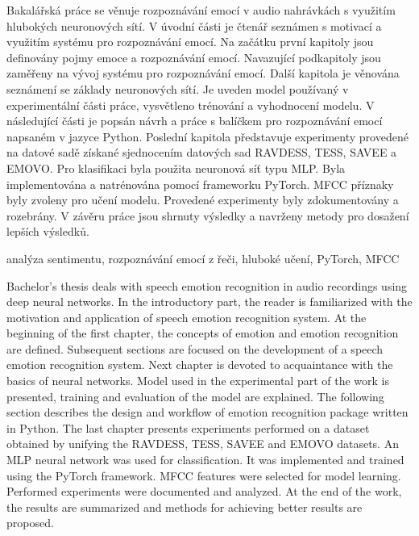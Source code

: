 \documentclass[FM,BP]{tulthesis}
\begin{document}

\begin{abstractCZ}
Bakalářská práce se věnuje rozpoznávání emocí v audio nahrávkách s využitím hlubokých neuronových sítí. V úvodní části je čtenář seznámen s motivací a využitím systému pro rozpoznávání emocí. Na začátku první kapitoly jsou definovány pojmy emoce a rozpoznávání emocí. Navazující podkapitoly jsou zaměřeny na vývoj systému pro rozpoznávání emocí. Další kapitola je věnována seznámení se základy neuronových sítí. Je uveden model používaný v experimentální části práce, vysvětleno trénování a vyhodnocení modelu. V následující části je popsán návrh a práce s balíčkem pro rozpoznávání emocí napsaném v jazyce Python. Poslední kapitola představuje experimenty provedené na datové sadě získané sjednocením datových sad RAVDESS, TESS, SAVEE a EMOVO. Pro klasifikaci byla použita neuronová síť typu MLP. Byla implementována a natrénována pomocí frameworku PyTorch. MFCC příznaky byly zvoleny pro učení modelu. Provedené experimenty byly zdokumentovány a rozebrány. V závěru práce jsou shrnuty výsledky a navrženy metody pro dosažení lepších výsledků.
\end{abstractCZ}

\begin{keywordsCZ}
analýza sentimentu, rozpoznávání emocí z řeči, hluboké učení, PyTorch, MFCC
\end{keywordsCZ}

\vspace{2cm}

\begin{abstractEN}
Bachelor's thesis deals with speech emotion recognition in audio recordings using deep neural networks. In the introductory part, the reader is familiarized with the motivation and application of speech emotion recognition system. At the beginning of the first chapter, the concepts of emotion and emotion recognition are defined. Subsequent sections are focused on the development of a speech emotion recognition system. Next chapter is devoted to acquaintance with the basics of neural networks. Model used in the experimental part of the work is presented, training and evaluation of the model are explained. The following section describes the design and workflow of emotion recognition package written in Python. The last chapter presents experiments performed on a dataset obtained by unifying the RAVDESS, TESS, SAVEE and EMOVO datasets. An MLP neural network was used for classification. It was implemented and trained using the PyTorch framework. MFCC features were selected for model learning. Performed experiments were documented and analyzed. At the end of the work, the results are summarized and methods for achieving better results are proposed.
\end{abstractEN}
\end{document}
